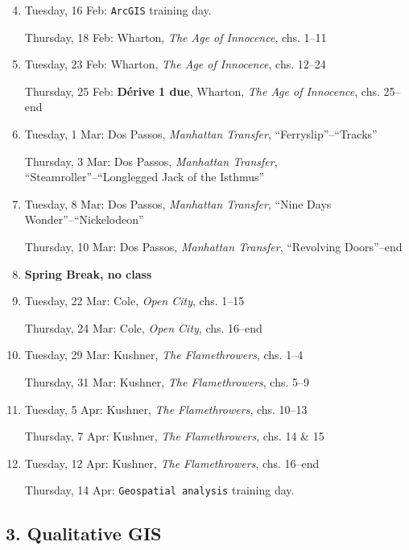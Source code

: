 \begin{enumerate}
 \setcounter{enumi}{3}
\item Tuesday, 16 Feb: \texttt{ArcGIS} training day.

  Thursday, 18 Feb: Wharton, \textit{The Age of Innocence}, chs. 1--11

  \item Tuesday, 23 Feb: Wharton, \textit{The Age of Innocence},  chs. 12--24

    Thursday, 25 Feb: \textbf{\small Dérive 1 due}, Wharton,  \textit{The Age of Innocence}, chs. 25--end
  
  \item Tuesday, 1 Mar: Dos Passos, \textit{Manhattan Transfer}, “Ferryslip”--“Tracks”

    Thursday, 3 Mar: Dos Passos,  \textit{Manhattan Transfer}, “Steamroller”--“Longlegged Jack of the Isthmus”

  \item Tuesday, 8 Mar: Dos Passos,  \textit{Manhattan Transfer}, “Nine Days Wonder”--“Nickelodeon”

    Thursday, 10 Mar: Dos Passos,  \textit{Manhattan Transfer}, “Revolving Doors”--end

  \item \textbf{Spring Break, no class}

  \item Tuesday, 22 Mar: Cole, \textit{Open City}, chs. 1--15

    Thursday, 24 Mar: Cole,  \textit{Open City}, chs. 16--end

  \item Tuesday, 29 Mar: Kushner, \textit{The Flamethrowers}, chs. 1--4

    Thursday, 31 Mar: Kushner, \textit{The Flamethrowers}, chs. 5--9

  \item Tuesday, 5 Apr: Kushner, \textit{The Flamethrowers}, chs. 10--13 
  
    Thursday, 7 Apr: Kushner, \textit{The Flamethrowers}, chs. 14 \& 15

  \item Tuesday, 12 Apr: Kushner, \textit{The Flamethrowers}, chs. 16--end 

    Thursday, 14 Apr: \texttt{Geospatial analysis} training day.

\end{enumerate}

\subsection{3. Qualitative GIS}

